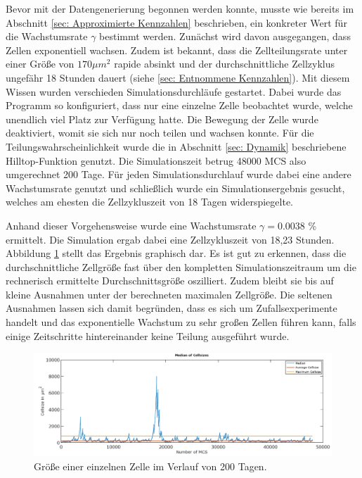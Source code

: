\documentclass[11pt,a4paper,pointlessnumbers]{scrreprt}  %
\begin{document}
Bevor mit der Datengenerierung begonnen werden konnte, musste wie bereits im Abschnitt \ref{sec: Approximierte Kennzahlen} beschrieben, ein konkreter Wert für die Wachstumsrate $\gamma$ bestimmt werden. Zunächst wird davon ausgegangen, dass Zellen exponentiell wachsen. Zudem ist bekannt, dass die Zellteilungsrate unter einer Größe von $170 \mu m^2$ rapide absinkt und der durchschnittliche Zellzyklus ungefähr 18 Stunden dauert (siehe \ref{sec: Entnommene Kennzahlen}). Mit diesem Wissen wurden verschieden Simulationsdurchläufe gestartet. Dabei wurde das Programm so konfiguriert, dass nur eine einzelne Zelle beobachtet wurde, welche unendlich viel Platz zur Verfügung hatte. Die Bewegung der Zelle wurde deaktiviert, womit sie sich nur noch teilen und wachsen konnte. Für die Teilungswahrscheinlichkeit wurde die in Abschnitt \ref{sec: Dynamik} beschriebene Hilltop-Funktion genutzt. Die Simulationszeit betrug 48000 MCS also umgerechnet 200 Tage. Für jeden Simulationsdurchlauf wurde dabei eine andere Wachstumsrate genutzt und schließlich wurde ein Simulationsergebnis gesucht, welches am ehesten die Zellzykluszeit von 18 Tagen widerspiegelte. 

Anhand dieser Vorgehensweise wurde eine Wachstumsrate $\gamma = 0.0038$ \% ermittelt. Die Simulation ergab dabei eine Zellzykluszeit von 18,23 Stunden. Abbildung \ref{fig:Wachstumsratenabschätzung} stellt das Ergebnis graphisch dar. Es ist gut zu erkennen, dass die durchschnittliche Zellgröße fast über den kompletten Simulationszeitraum um die rechnerisch ermittelte Durchschnittsgröße oszilliert. Zudem bleibt sie bis auf kleine Ausnahmen unter der berechneten maximalen Zellgröße. Die seltenen Ausnahmen lassen sich damit begründen, dass es sich um Zufallsexperimente handelt und das exponentielle Wachstum zu sehr großen Zellen führen kann, falls einige Zeitschritte hintereinander keine Teilung ausgeführt wurde. 

\newpage

\begin{figure}[!ht]
	\vspace{2cm}
	\centering
	\includegraphics{MedianSingleCell}
	\caption{Größe einer einzelnen Zelle im Verlauf von 200 Tagen. }
	\label{fig:Wachstumsratenabschätzung}
\end{figure}
\end{document}
